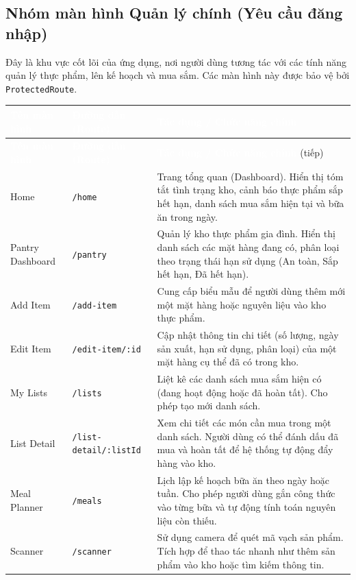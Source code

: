 \documentclass[12pt,a4paper]{article}
\newcommand{\code}[1]{\texttt{#1}}
\newcommand{\thead}[1]{\textbf{\textcolor{white}{#1}}}
\begin{document}
\subsection{Nhóm màn hình Quản lý chính (Yêu cầu đăng nhập)}

Đây là khu vực cốt lõi của ứng dụng, nơi người dùng tương tác với các tính năng quản lý thực phẩm, lên kế hoạch và mua sắm. Các màn hình này được bảo vệ bởi \code{ProtectedRoute}.

\begin{longtable}{|>{\raggedright\arraybackslash}p{3.5cm}|>{\raggedright\arraybackslash}p{4cm}|>{\raggedright\arraybackslash}p{7.5cm}|}
\hline
\rowcolor{headerblue}
\thead{Tên màn hình} & \thead{Đường dẫn (Route)} & \thead{Tác dụng / Chức năng chính} \\
\hline
\endfirsthead
\hline
\rowcolor{headerblue}
\thead{Tên màn hình} & \thead{Đường dẫn (Route)} & \thead{Tác dụng / Chức năng chính} (tiếp) \\
\hline
\endhead
Home & \code{/home} & Trang tổng quan (Dashboard). Hiển thị tóm tắt tình trạng kho, cảnh báo thực phẩm sắp hết hạn, danh sách mua sắm hiện tại và bữa ăn trong ngày. \\
\hline
Pantry Dashboard & \code{/pantry} & Quản lý kho thực phẩm gia đình. Hiển thị danh sách các mặt hàng đang có, phân loại theo trạng thái hạn sử dụng (An toàn, Sắp hết hạn, Đã hết hạn). \\
\hline
Add Item & \code{/add-item} & Cung cấp biểu mẫu để người dùng thêm mới một mặt hàng hoặc nguyên liệu vào kho thực phẩm. \\
\hline
Edit Item & \code{/edit-item/:id} & Cập nhật thông tin chi tiết (số lượng, ngày sản xuất, hạn sử dụng, phân loại) của một mặt hàng cụ thể đã có trong kho. \\
\hline
My Lists & \code{/lists} & Liệt kê các danh sách mua sắm hiện có (đang hoạt động hoặc đã hoàn tất). Cho phép tạo mới danh sách. \\
\hline
List Detail & \code{/list-detail/:listId} & Xem chi tiết các món cần mua trong một danh sách. Người dùng có thể đánh dấu đã mua và hoàn tất để hệ thống tự động đẩy hàng vào kho. \\
\hline
Meal Planner & \code{/meals} & Lịch lập kế hoạch bữa ăn theo ngày hoặc tuần. Cho phép người dùng gắn công thức vào từng bữa và tự động tính toán nguyên liệu còn thiếu. \\
\hline
Scanner & \code{/scanner} & Sử dụng camera để quét mã vạch sản phẩm. Tích hợp để thao tác nhanh như thêm sản phẩm vào kho hoặc tìm kiếm thông tin. \\
\hline
\end{longtable}
\end{document}
